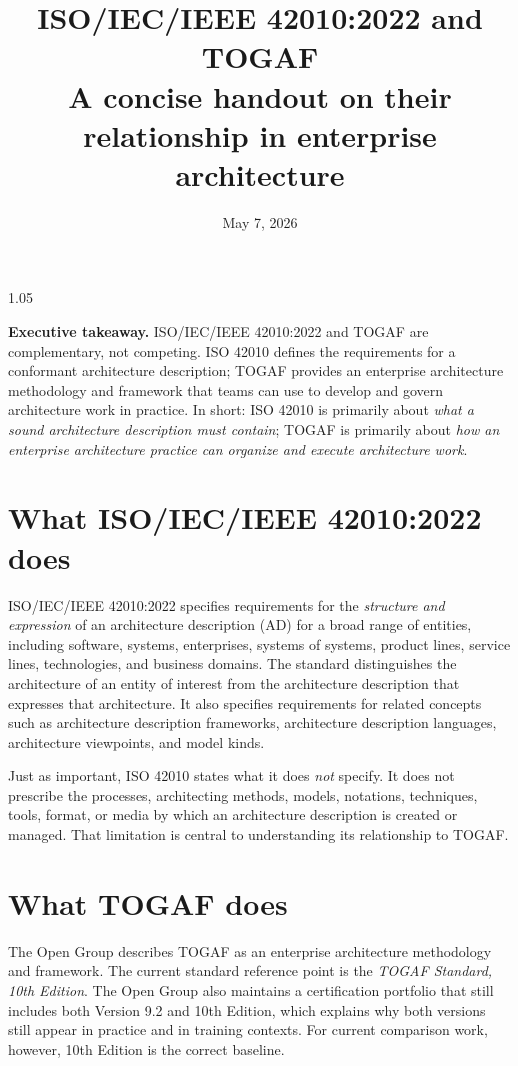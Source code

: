 \documentclass[11pt]{article}
\title{\textbf{ISO/IEC/IEEE 42010:2022 and TOGAF}\\[0.35em]
\large A concise handout on their relationship in enterprise architecture}
\author{}
\date{May 7, 2026}
\begin{document}
\maketitle
\thispagestyle{fancy}

\begin{spacing}{1.05}

\textbf{Executive takeaway.} ISO/IEC/IEEE 42010:2022 and TOGAF are complementary, not competing. ISO 42010 defines the requirements for a conformant architecture description; TOGAF provides an enterprise architecture methodology and framework that teams can use to develop and govern architecture work in practice. In short: ISO 42010 is primarily about \emph{what a sound architecture description must contain}; TOGAF is primarily about \emph{how an enterprise architecture practice can organize and execute architecture work}.\cite{iso42010,togaf,togafadm}

\section{What ISO/IEC/IEEE 42010:2022 does}

ISO/IEC/IEEE 42010:2022 specifies requirements for the \emph{structure and expression} of an architecture description (AD) for a broad range of entities, including software, systems, enterprises, systems of systems, product lines, service lines, technologies, and business domains. The standard distinguishes the architecture of an entity of interest from the architecture description that expresses that architecture. It also specifies requirements for related concepts such as architecture description frameworks, architecture description languages, architecture viewpoints, and model kinds.\cite{iso42010,ieee42010}

Just as important, ISO 42010 states what it does \emph{not} specify. It does not prescribe the processes, architecting methods, models, notations, techniques, tools, format, or media by which an architecture description is created or managed. That limitation is central to understanding its relationship to TOGAF.\cite{iso42010}

\section{What TOGAF does}

The Open Group describes TOGAF as an enterprise architecture methodology and framework. The current standard reference point is the \emph{TOGAF Standard, 10th Edition}. The Open Group also maintains a certification portfolio that still includes both Version 9.2 and 10th Edition, which explains why both versions still appear in practice and in training contexts. For current comparison work, however, 10th Edition is the correct baseline.\cite{togaf,togaf10,togafcert}


\end{spacing}
\end{document}
